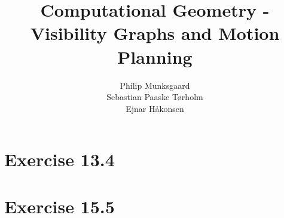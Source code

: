 \documentclass[11pt,a4paper]{article}
\title{Computational Geometry - Visibility Graphs and Motion Planning}
\author{Philip Munksgaard \\ Sebastian Paaske Tørholm \\ Ejnar Håkonsen}
\begin{document}
\maketitle

\section{Exercise 13.4}


\section{Exercise 15.5}

\end{document}
